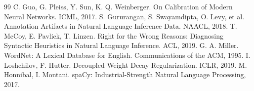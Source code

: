 \documentclass[10pt,twocolumn]{article}
\begin{document}
\begin{thebibliography}{99}
 C. Guo, G. Pleiss, Y. Sun, K. Q. Weinberger. On Calibration of Modern Neural Networks. ICML, 2017.
 S. Gururangan, S. Swayamdipta, O. Levy, et al. Annotation Artifacts in Natural Language Inference Data. NAACL, 2018.
 T. McCoy, E. Pavlick, T. Linzen. Right for the Wrong Reasons: Diagnosing Syntactic Heuristics in Natural Language Inference. ACL, 2019.
 G. A. Miller. WordNet: A Lexical Database for English. Communications of the ACM, 1995.
 I. Loshchilov, F. Hutter. Decoupled Weight Decay Regularization. ICLR, 2019.
 M. Honnibal, I. Montani. spaCy: Industrial-Strength Natural Language Processing, 2017.
\end{thebibliography}
\end{document}
